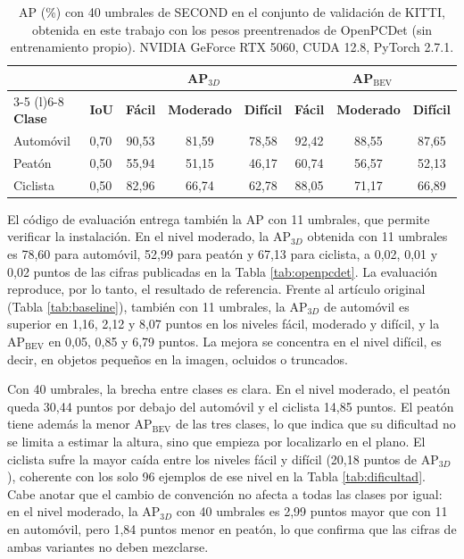 \documentclass[11pt,letterpaper]{article}
\begin{document}
\begin{table}[htbp]
\caption{AP (\%) con 40 umbrales de SECOND en el conjunto de validación de KITTI, obtenida en este trabajo con los pesos preentrenados de OpenPCDet \cite{openpcdet} (sin entrenamiento propio). NVIDIA GeForce RTX 5060, CUDA 12.8, PyTorch 2.7.1.}
\label{tab:propios}
\centering
\small
\begin{tabular}{@{}llcccccc@{}}
\toprule
 & & \multicolumn{3}{c}{\textbf{AP$_{3D}$}} & \multicolumn{3}{c}{\textbf{AP$_{\text{BEV}}$}} \\
\cmidrule(lr){3-5} \cmidrule(l){6-8}
\textbf{Clase} & \textbf{IoU} & \textbf{Fácil} & \textbf{Moderado} & \textbf{Difícil} & \textbf{Fácil} & \textbf{Moderado} & \textbf{Difícil} \\
\midrule
Automóvil & 0,70 & 90,53 & 81,59 & 78,58 & 92,42 & 88,55 & 87,65 \\
Peatón & 0,50 & 55,94 & 51,15 & 46,17 & 60,74 & 56,57 & 52,13 \\
Ciclista & 0,50 & 82,96 & 66,74 & 62,78 & 88,05 & 71,17 & 66,89 \\
\bottomrule
\end{tabular}
\end{table}

El código de evaluación entrega también la AP con 11 umbrales, que permite verificar la instalación. En el nivel moderado, la AP$_{3D}$ obtenida con 11 umbrales es 78,60 para automóvil, 52,99 para peatón y 67,13 para ciclista, a 0,02, 0,01 y 0,02 puntos de las cifras publicadas en la Tabla \ref{tab:openpcdet}. La evaluación reproduce, por lo tanto, el resultado de referencia. Frente al artículo original (Tabla \ref{tab:baseline}), también con 11 umbrales, la AP$_{3D}$ de automóvil es superior en 1,16, 2,12 y 8,07 puntos en los niveles fácil, moderado y difícil, y la AP$_{\text{BEV}}$ en 0,05, 0,85 y 6,79 puntos. La mejora se concentra en el nivel difícil, es decir, en objetos pequeños en la imagen, ocluidos o truncados.

Con 40 umbrales, la brecha entre clases es clara. En el nivel moderado, el peatón queda 30,44 puntos por debajo del automóvil y el ciclista 14,85 puntos. El peatón tiene además la menor AP$_{\text{BEV}}$ de las tres clases, lo que indica que su dificultad no se limita a estimar la altura, sino que empieza por localizarlo en el plano. El ciclista sufre la mayor caída entre los niveles fácil y difícil (20,18 puntos de AP$_{3D}$), coherente con los solo 96 ejemplos de ese nivel en la Tabla \ref{tab:dificultad}. Cabe anotar que el cambio de convención no afecta a todas las clases por igual: en el nivel moderado, la AP$_{3D}$ con 40 umbrales es 2,99 puntos mayor que con 11 en automóvil, pero 1,84 puntos menor en peatón, lo que confirma que las cifras de ambas variantes no deben mezclarse.
\end{document}

